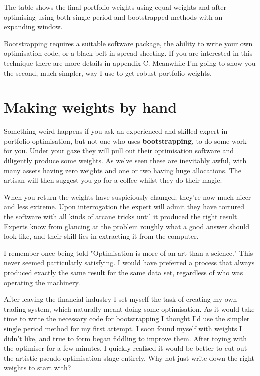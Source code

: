 The table shows the final portfolio weights using equal weights and after optimising using both single period and bootstrapped methods with an expanding window.

Bootstrapping requires a suitable software package, the ability to write your own optimisation code, or a black belt in spread-sheeting. If you are interested in this technique there are more details in appendix C. Meanwhile I'm going to show you the second, much simpler, way I use to get robust portfolio weights.

\section*{Making weights by hand}  {}

Something weird happens if you ask an experienced and skilled expert in portfolio optimisation, but not one who uses \textbf{bootstrapping}, to do some work for you. Under your gaze they will pull out their optimisation software and diligently produce some weights. As we've seen these are inevitably awful, with many assets having zero weights and one or two having huge allocations. The artisan will then suggest you go for a coffee whilst they do their magic.

When you return the weights have suspiciously changed; they're now much nicer and less extreme. Upon interrogation the expert will admit they have tortured the software with all kinds of arcane tricks until it produced the right result. Experts know from glancing at the problem roughly what a good answer should look like, and their skill lies in extracting it from the computer.

I remember once being told "Optimisation is more of an art than a science." This never seemed particularly satisfying. I would have preferred a process that always produced exactly the same result for the same data set, regardless of who was operating the machinery.

After leaving the financial industry I set myself the task of creating my own trading system, which naturally meant doing some optimisation. As it would take time to write the necessary code for bootstrapping I thought I'd use the simpler single period method for my first attempt. I soon found myself with weights I didn't like, and true to form began fiddling to improve them. After toying with the optimiser for a few minutes, I quickly realised it would be better to cut out the artistic pseudo-optimisation stage entirely. Why not just write down the right weights to start with?

